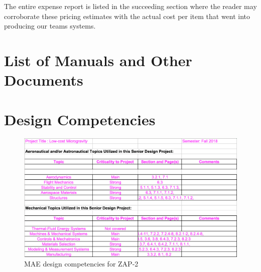 The entire expense report is listed in the succeeding section where the reader may corroborate these pricing estimates with the actual cost per item that went into producing our teams systems. 






\section{List of Manuals and Other Documents}


\section{Design Competencies}

\begin{figure}[ht]
  \centering
  \includegraphics[width=1\textwidth]{Figures/DesignCompetence.png}
  \caption{\label{fig:DesignComp}MAE design competencies for ZAP-2}
\end{figure}

